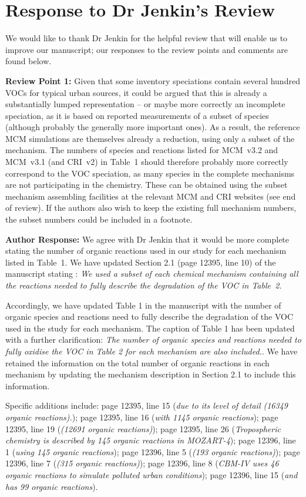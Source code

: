 \documentclass{article}
\begin{document}
\section*{Response to Dr Jenkin's Review}

We would like to thank Dr Jenkin for the helpful review that will enable us to improve our manuscript; our responses to the review points and comments are found below.

\textbf{Review Point 1:} Given that some inventory speciations contain several hundred VOCs for typical urban sources, it could be argued that this is already a substantially lumped representation – or maybe more correctly an incomplete speciation, as it is based on reported measurements of a subset of species (although probably the generally more important ones). As a result, the reference MCM simulations are themselves already a reduction, using only a subset of the mechanism. The numbers of species and reactions listed for MCM~v3.2 and MCM~v3.1 (and CRI~v2) in Table~1 should therefore probably more correctly correspond to the VOC speciation, as many species in the complete mechanisms are not participating in the chemistry. These can be obtained using the subset mechanism assembling facilities at the relevant MCM and CRI websites (see end of review). If the authors also wish to keep the existing full mechanism numbers, the subset numbers could be included in a footnote.

\textbf{Author Response:} We agree with Dr Jenkin that it would be more complete stating the number of organic reactions used in our study for each mechanism listed in Table~1. 
We have updated Section 2.1 (page 12395, line 10) of the manuscript stating :
\textit{We used a subset of each chemical mechanism containing all the reactions needed to fully describe the degradation of the VOC in Table~2.  }

Accordingly, we have updated Table 1 in the manuscript with the number of organic species and reactions need to fully describe the degradation of the VOC used in the study for each mechanism. 
The caption of Table 1 has been updated with a further clarification: \textit{The number of organic species and reactions needed to fully oxidise the VOC in Table 2 for each mechanism are also included.}.
We have retained the information on the total number of organic reactions in each mechanism by updating the mechanism description in Section 2.1 to include this information.

Specific additions include: page 12395, line 15 (\textit{due to its level of detail (16349 organic reactions).}); page 12395, line 16 (\textit{with 1145 organic reactions}); page 12395, line 19 (\textit{(12691 organic reactions)}); page 12395, line 26 (\textit{Tropospheric chemistry is described by 145 organic reactions in MOZART-4}); page 12396, line 1 (\textit{using 145 organic reactions}); page 12396, line 5 (\textit{(193 organic reactions)}); page 12396, line 7 (\textit{(315 organic reactions)}); page 12396, line 8 (\textit{CBM-IV uses 46 organic reactions to simulate polluted urban conditions}); page 12396, line 15 (\textit{and has 99 organic reactions}).
\end{document}
